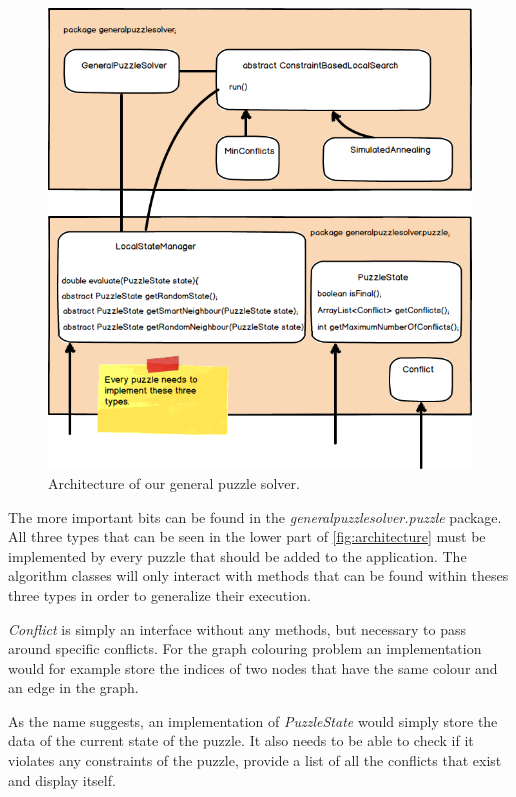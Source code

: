 \documentclass{scrartcl}
\begin{document}
 \begin{figure}[!htbp]
 \includegraphics[width=1.0\linewidth]{graphics/architecture-diagram.png}
\caption{Architecture of our general puzzle solver.}\label{fig:architecture}
 \end{figure}

The more important bits can be found in the \textit{generalpuzzlesolver.puzzle} package. All three types that can be seen in the lower part of \autoref{fig:architecture} must be implemented by every puzzle that should be added to the application. The algorithm classes will only interact with methods that can be found within theses three types in order to generalize their execution.

\textit{Conflict} is simply an interface without any methods, but necessary to pass around specific conflicts. For the graph colouring problem an implementation would for example store the indices of two nodes that have the same colour and an edge in the graph.

As the name suggests, an implementation of \textit{PuzzleState} would simply store the data of the current state of the puzzle. It also needs to be able to check if it violates any constraints of the puzzle, provide a list of all the conflicts that exist and display itself.
\end{document}
